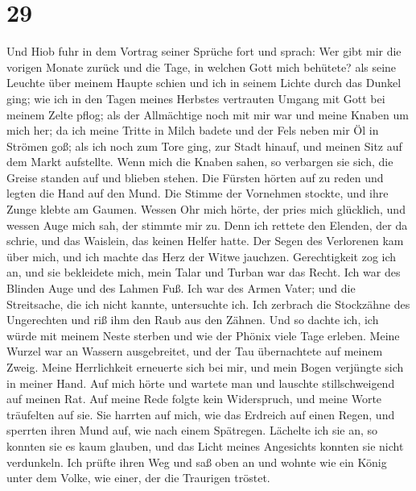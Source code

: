 \hypertarget{section-28}{%
\section{29}\label{section-28}}

 Und Hiob fuhr in dem Vortrag seiner Sprüche fort und
sprach:  Wer gibt mir die vorigen Monate zurück und die
Tage, in welchen Gott mich behütete?  als seine Leuchte
über meinem Haupte schien und ich in seinem Lichte durch das Dunkel
ging;  wie ich in den Tagen meines Herbstes vertrauten
Umgang mit Gott bei meinem Zelte pflog;  als der
Allmächtige noch mit mir war und meine Knaben um mich her;
 da ich meine Tritte in Milch badete und der Fels neben
mir Öl in Strömen goß;  als ich noch zum Tore ging, zur
Stadt hinauf, und meinen Sitz auf dem Markt aufstellte. 
Wenn mich die Knaben sahen, so verbargen sie sich, die Greise standen
auf und blieben stehen.  Die Fürsten hörten auf zu reden
und legten die Hand auf den Mund.  Die Stimme der
Vornehmen stockte, und ihre Zunge klebte am Gaumen. 
Wessen Ohr mich hörte, der pries mich glücklich, und wessen Auge mich
sah, der stimmte mir zu.  Denn ich rettete den Elenden,
der da schrie, und das Waislein, das keinen Helfer hatte.
 Der Segen des Verlorenen kam über mich, und ich machte
das Herz der Witwe jauchzen.  Gerechtigkeit zog ich an,
und sie bekleidete mich, mein Talar und Turban war das Recht.
 Ich war des Blinden Auge und des Lahmen Fuß.
 Ich war des Armen Vater; und die Streitsache, die ich
nicht kannte, untersuchte ich.  Ich zerbrach die
Stockzähne des Ungerechten und riß ihm den Raub aus den Zähnen.
 Und so dachte ich, ich würde mit meinem Neste sterben
und wie der Phönix viele Tage erleben.  Meine Wurzel war
an Wassern ausgebreitet, und der Tau übernachtete auf meinem Zweig.
 Meine Herrlichkeit erneuerte sich bei mir, und mein
Bogen verjüngte sich in meiner Hand.  Auf mich hörte und
wartete man und lauschte stillschweigend auf meinen Rat. 
Auf meine Rede folgte kein Widerspruch, und meine Worte träufelten auf
sie.  Sie harrten auf mich, wie das Erdreich auf einen
Regen, und sperrten ihren Mund auf, wie nach einem Spätregen.
 Lächelte ich sie an, so konnten sie es kaum glauben, und
das Licht meines Angesichts konnten sie nicht verdunkeln.
 Ich prüfte ihren Weg und saß oben an und wohnte wie ein
König unter dem Volke, wie einer, der die Traurigen tröstet.


